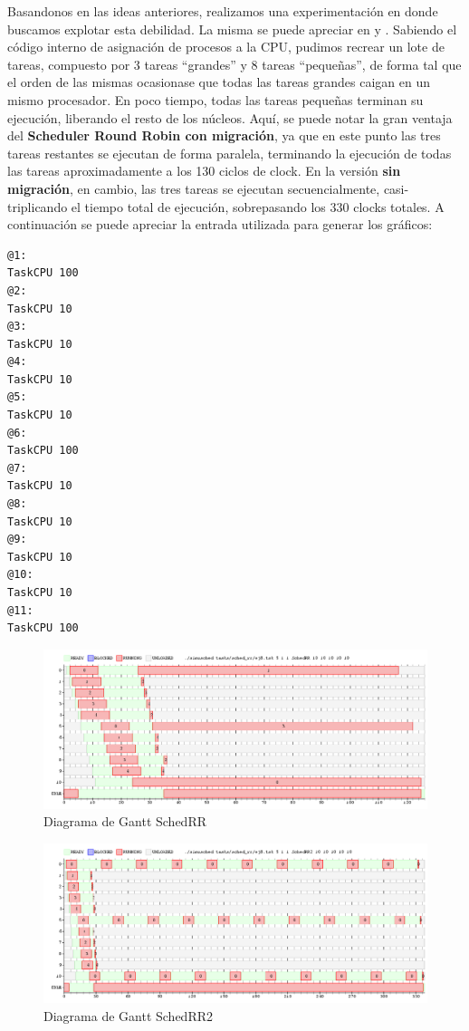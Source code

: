 \documentclass[11pt, a4paper, twoside]{article}
\begin{document}
Basandonos en las ideas anteriores, realizamos una experimentación en donde buscamos
explotar esta debilidad. La misma se puede apreciar en  y . Sabiendo
el código interno de asignación de procesos a la CPU, pudimos recrear un lote de tareas, compuesto
por 3 tareas ``grandes'' y 8 tareas ``pequeñas'', de forma tal que el orden de las mismas ocasionase 
que todas las tareas grandes caigan en un mismo procesador. En poco tiempo, todas las tareas pequeñas
terminan su ejecución, liberando el resto de los núcleos. Aquí, se puede notar la gran ventaja del
\textbf{Scheduler Round Robin con migración}, ya que en este punto las tres tareas restantes se 
ejecutan de forma paralela, terminando la ejecución de todas las tareas aproximadamente a los 
130 ciclos de clock. En la versión \textbf{sin migración}, en cambio, las tres tareas se ejecutan
secuencialmente, casi-triplicando el tiempo total de ejecución, sobrepasando los 330 clocks totales.
A continuación se puede apreciar la entrada utilizada para generar los gráficos:

\begin{center}
\begin{minipage}{0.4\textwidth}
\begin{Verbatim}[frame=single,framesep=1cm,label=ej8.tsk]
@1:
TaskCPU 100
@2:
TaskCPU 10
@3:
TaskCPU 10
@4:
TaskCPU 10
@5:
TaskCPU 10
@6:
TaskCPU 100
@7:
TaskCPU 10
@8:
TaskCPU 10
@9:
TaskCPU 10
@10:
TaskCPU 10
@11:
TaskCPU 100
\end{Verbatim}
\end{minipage}
\end{center}

\begin{figure}[H]
\includegraphics [width=\textwidth]{../graficos/sched_rr/ej8-sched-rr.png}
\caption{Diagrama de Gantt SchedRR}
\label{fig:ej8-1}
\end{figure}
\begin{figure}[H]
\includegraphics [width=\textwidth]{../graficos/sched_rr/ej8-sched-rr2.png}
\caption{Diagrama de Gantt SchedRR2}
\label{fig:ej8-2}
\end{figure}
\end{document}

